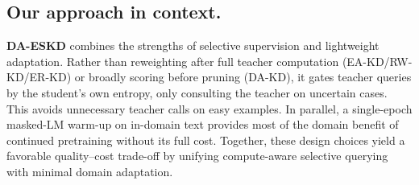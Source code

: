 \subsection{Our approach in context.}
\textbf{DA-ESKD} combines the strengths of selective supervision and lightweight adaptation. Rather than reweighting after full teacher computation (EA-KD/RW-KD/ER-KD) or broadly scoring before pruning (DA-KD), it gates teacher queries by the student’s own entropy, only consulting the teacher on uncertain cases. This avoids unnecessary teacher calls on easy examples. In parallel, a single-epoch masked-LM warm-up on in-domain text provides most of the domain benefit of continued pretraining without its full cost. Together, these design choices yield a favorable quality--cost trade-off by unifying compute-aware selective querying with minimal domain adaptation.
